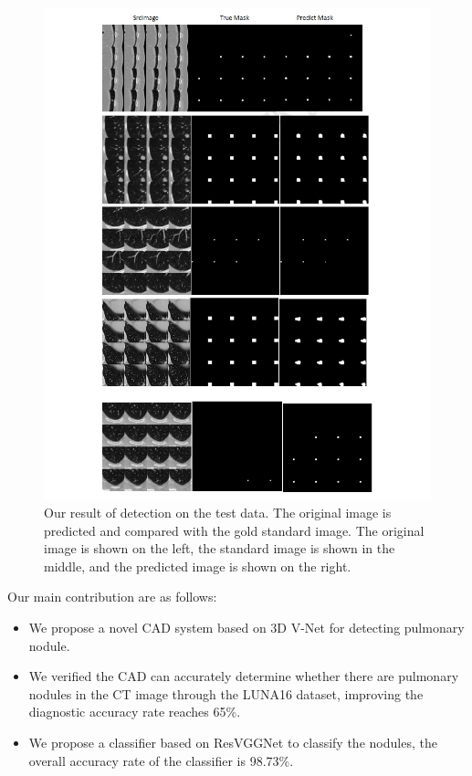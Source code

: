\documentclass[conference]{IEEEtran}
\begin{document}
\begin{figure}[htbp]
    \centerline{\includegraphics[scale=0.5]{segImage.jpg}}
    \caption{Our result of detection on the test data. The original image is predicted and compared with the gold standard image. The original image is shown on the left, the standard image is shown in the middle, and the predicted image is shown on the right.}
    \label{fig3}
    \end{figure}
Our main contribution are as follows:
\begin{itemize}
    \item We propose a novel CAD system based on 3D V-Net for detecting pulmonary nodule.
    \item We verified the CAD can accurately determine whether there are pulmonary nodules in the CT image through the LUNA16 dataset, improving the diagnostic accuracy rate reaches 65$\%$.
    \item We propose a classifier based on ResVGGNet to classify the nodules, the overall accuracy rate of the classifier is 98.73$\%$.
\end{itemize}
\end{document}
